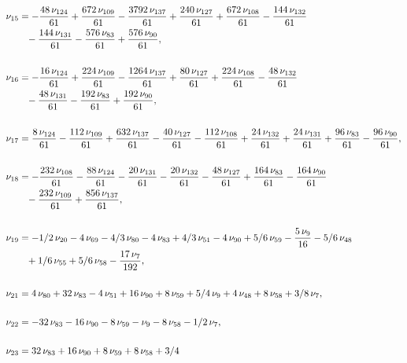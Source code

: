 \documentclass[a4paper,12pt, DIV=14, BCOR=5mm, twoside, headsepline, numbers=noenddot]{scrbook}
\begin{document}
\begin{align}\label{AreaSol3}
\begin{aligned}
\nu_{{15}}&=-{
\frac {48\,\nu_{{124}}}{61}}+{\frac {672\,\nu_{{109}}}{61}}-{\frac {
3792\,\nu_{{137}}}{61}}+{\frac {240\,\nu_{{127}}}{61}}+{\frac {672\,
\nu_{{108}}}{61}}-{\frac {144\,\nu_{{132}}}{61}}\\
 &\hphantom{=}-{\frac {144\,\nu_{{
131}}}{61}}-{\frac {576\,\nu_{{83}}}{61}}+{\frac {576\,\nu_{{90}}}{61}
}, \\
\\
\nu_{{16}}&=-{\frac {16\,\nu_{{124}}}{61}}+{\frac {224\,\nu_{{109}}}{
61}}-{\frac {1264\,\nu_{{137}}}{61}}+{\frac {80\,\nu_{{127}}}{61}}+{
\frac {224\,\nu_{{108}}}{61}}-{\frac {48\,\nu_{{132}}}{61}}\\
 &\hphantom{=}-{\frac {48
\,\nu_{{131}}}{61}}-{\frac {192\,\nu_{{83}}}{61}}+{\frac {192\,\nu_{{
90}}}{61}}, \\
\\
\nu_{{17}}&={\frac {8\,\nu_{{124}}}{61}}-{\frac {112\,\nu_{{
109}}}{61}}+{\frac {632\,\nu_{{137}}}{61}}-{\frac {40\,\nu_{{127}}}{61
}}-{\frac {112\,\nu_{{108}}}{61}}+{\frac {24\,\nu_{{132}}}{61}}+{
\frac {24\,\nu_{{131}}}{61}}+{\frac {96\,\nu_{{83}}}{61}}-{\frac {96\,
\nu_{{90}}}{61}}, \\
\\
\nu_{{18}}&=-{\frac {232\,\nu_{{108}}}{61}}-{\frac {88
\,\nu_{{124}}}{61}}-{\frac {20\,\nu_{{131}}}{61}}-{\frac {20\,\nu_{{
132}}}{61}}-{\frac {48\,\nu_{{127}}}{61}}+{\frac {164\,\nu_{{83}}}{61}
}-{\frac {164\,\nu_{{90}}}{61}}\\
 &\hphantom{=}-{\frac {232\,\nu_{{109}}}{61}}+{\frac 
{856\,\nu_{{137}}}{61}}, \\
\\
\nu_{{19}}&=-1/2\,\nu_{{20}}-4\,\nu_{{69}}-4/3
\,\nu_{{80}}-4\,\nu_{{83}}+4/3\,\nu_{{51}}-4\,\nu_{{90}}+5/6\,\nu_{{59
}}-{\frac {5\,\nu_{{9}}}{16}}-5/6\,\nu_{{48}}\\
 &\hphantom{=}+1/6\,\nu_{{55}}+5/6\,\nu
_{{58}}-{\frac {17\,\nu_{{7}}}{192}}, \\
\\
\nu_{{21}}&=4\,\nu_{{80}}+32\,\nu_
{{83}}-4\,\nu_{{51}}+16\,\nu_{{90}}+8\,\nu_{{59}}+5/4\,\nu_{{9}}+4\,
\nu_{{48}}+8\,\nu_{{58}}+3/8\,\nu_{{7}}, \\
\\
\nu_{{22}}&=-32\,\nu_{{83}}-16
\,\nu_{{90}}-8\,\nu_{{59}}-\nu_{{9}}-8\,\nu_{{58}}-1/2\,\nu_{{7}}, \\
\\
\nu_
{{23}}&=32\,\nu_{{83}}+16\,\nu_{{90}}+8\,\nu_{{59}}+8\,\nu_{{58}}+3/4\,

\end{aligned}
\end{align}
\end{document}
